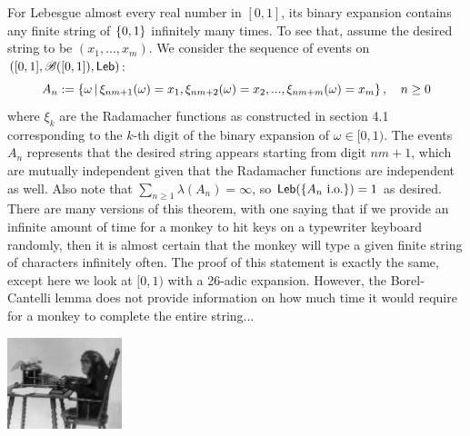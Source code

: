 \begin{example}
For Lebesgue almost every real number in $[0,1]$, its binary expansion contains any finite string of $\left\{ 0,1 \right \}$ infinitely many times. To see that, assume the desired string to be $(x_1,...,x_m)$. We consider the sequence of events on $([0,1], \mathcal{B}([0,1]), \mathsf{Leb})$:
\begin{equation*}
A_n := \left\{ \omega \,|\, \xi_{nm+1}(\omega) = x_1, \xi_{nm+2}(\omega) = x_2, ..., \xi_{nm+m}(\omega) = x_m \right \}, \quad n \geq 0
\end{equation*}
where $\xi_k$ are the Radamacher functions as constructed in section 4.1 corresponding to the $k$-th digit of the binary expansion of $\omega \in [0,1)$. The events $A_n$ represents that the desired string appears starting from digit $nm+1$, which are mutually independent given that the Radamacher functions are independent as well. Also note that $\sum_{n\geq 1} \lambda(A_n) = \infty$, so $\mathsf{Leb}(\left\{ A_n \text{ i.o.} \right \}) = 1$ as desired. \\

There are many versions of this theorem, with one saying that if we provide an infinite amount of time for a monkey to hit keys on a typewriter keyboard randomly, then it is almost certain that the monkey will type a given finite string of characters infinitely often. The proof of this statement is exactly the same, except here we look at $[0,1)$ with a 26-adic expansion. However, the Borel-Cantelli lemma does not provide information on how much time it would require for a monkey to complete the entire string...

\begin{center}
\includegraphics[width=0.25\textwidth]{figures/chimpanzee.jpg}
\end{center}
\end{example}
\newpage 

